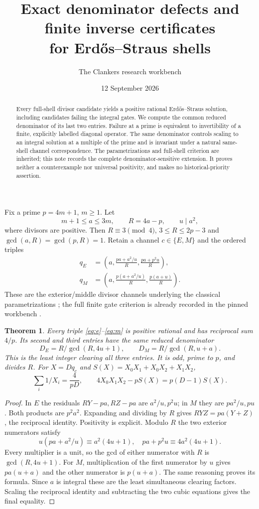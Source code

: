 \documentclass[11pt]{amsart}
\title{Exact denominator defects and finite inverse certificates\\for Erd\H{o}s--Straus shells}
\author{The Clankers research workbench}
\date{12 September 2026}
\newtheorem{theorem}{Theorem}\newtheorem{proposition}[theorem]{Proposition}
\theoremstyle{remark}\newtheorem{remark}[theorem]{Remark}
\begin{document}
\begin{abstract}
Every full-shell divisor candidate yields a positive rational Erd\H{o}s--Straus
solution, including candidates failing the integral gates. We compute the common
reduced denominator of its last two entries. Failure at a prime is equivalent
to invertibility of a finite, explicitly labelled diagonal operator. The same
denominator controls scaling to an integral solution at a multiple of the prime
and is invariant under a natural same-shell channel correspondence. The
parametrizations and full-shell criterion are inherited; this note records the
complete denominator-sensitive extension. It proves neither a counterexample
nor universal positivity, and makes no historical-priority assertion.
\end{abstract}
\maketitle

Fix a prime $p=4m+1$, $m\ge1$. Let
\[
 m+1\le a\le3m,\qquad R=4a-p,\qquad u\mid a^2,
\]
where divisors are positive. Then $R\equiv3\pmod4$,
$3\le R\le2p-3$ and $\gcd(a,R)=\gcd(p,R)=1$.
Retain a channel $c\in\{E,M\}$ and the ordered triples
\begin{align}
 q_E&=\left(a,\frac{pa+a^2/u}{R},\frac{pa+p^2u}{R}\right),\label{eq:e}\\
 q_M&=\left(a,\frac{p(a+a^2/u)}R,\frac{p(a+u)}R\right).\label{eq:m}
\end{align}
These are the exterior/middle divisor channels underlying the classical
parametrizations \cite{y,et}; the full finite gate criterion is already
recorded in the pinned workbench \cite{f}.

\begin{theorem}
Every triple \eqref{eq:e}--\eqref{eq:m} is positive rational and has reciprocal
sum $4/p$. Its second and third entries have the same reduced denominator
\[
 \boxed{D_E=R/\gcd(R,4u+1),\qquad D_M=R/\gcd(R,u+a).}
\]
This is the least integer clearing all three entries. It is odd, prime to $p$,
and divides $R$. For $X=Dq_c$ and $S(X)=X_0X_1+X_0X_2+X_1X_2$,
\[
 \sum_i1/X_i=\frac4{pD},\qquad
 4X_0X_1X_2-pS(X)=p(D-1)S(X).
\]
\end{theorem}
\begin{proof}
In $E$ the residuals $RY-pa,RZ-pa$ are $a^2/u,p^2u$; in $M$ they are
$pa^2/u,pu$. Both products are $p^2a^2$. Expanding and dividing by $R$
gives $RYZ=pa(Y+Z)$, the reciprocal identity. Positivity is explicit.
Modulo $R$ the two exterior numerators satisfy
\[
 u(pa+a^2/u)\equiv a^2(4u+1),\quad
 pa+p^2u\equiv4a^2(4u+1).
\]
Every multiplier is a unit, so the gcd of either numerator with $R$ is
$\gcd(R,4u+1)$. For $M$, multiplication of the first numerator by $u$
gives $pa(u+a)$ and the other numerator is $p(u+a)$. The same reasoning
proves its formula. Since $a$ is integral these are the least simultaneous
clearing factors. Scaling the reciprocal identity and subtracting the two
cubic equations gives the final equality.
\end{proof}
\end{document}
